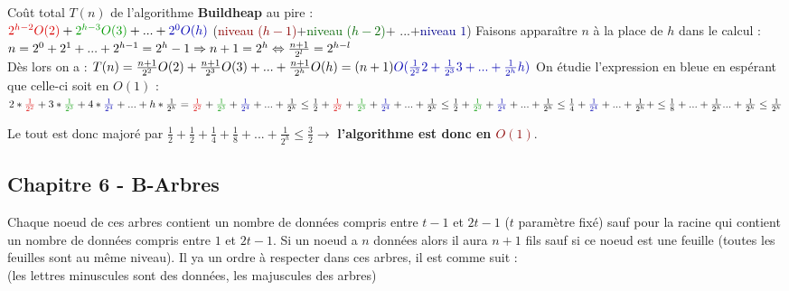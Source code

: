 \documentclass{article}
\newcommand{\gre}[1]{\textcolor{darkgreen}{#1}}
\newcommand{\blu}[1]{\textcolor{darkblue}{#1}}
\newcommand{\red}[1]{\textcolor{darkred}{#1}}
\begin{document}
\noindent Coût total $T(n)$ de l'algorithme \textbf{Buildheap} au pire : \\
$\red{2^{h-2}O(2)} + \gre{2^{h-3}O(3)} + ... + \blu{2^0O(h)}$ (\red{niveau ($h-1$)}$+$\gre{niveau ($h-2$)}$+$
...$+$\blu{niveau $1$})
Faisons apparaître $n$ à la place de $h$ dans le calcul : \\
$n = 2^0 + 2^1 + ... + 2^{h-1} = 2^h-1 \Rightarrow n+1 = 2^h \\
\Leftrightarrow \frac{n+1}{2^l} = 2^{h-l}$ \\
Dès lors on a : $T(n) \\ 
= \frac{n+1}{2^2}O(2) + \frac{n+1}{2^3}O(3) + ... + \frac{n+1}{2^h} O(h)\\
= (n+1) \blu{O(\frac{1}{2^2}2 + \frac{1}{2^3}3 + ... + \frac{1}{2^h}h)}$
On étudie l'expression en bleue en espérant que celle-ci soit en $O(1)$ :
$2*\red{\frac{1}{2^2}} + 3*\gre{\frac{1}{2^3}} + 4*\blu{\frac{1}{2^4}} + ... + h*\frac{1}{2^h}\\
= \red{\frac{1}{2^2}} + \gre{\frac{1}{2^3}} + \blu{\frac{1}{2^4}} + ... + \frac{1}{2^h} \leq \frac{1}{2}\\
+ \red{\frac{1}{2^2}} + \gre{\frac{1}{2^3}} + \blu{\frac{1}{2^4}} + ... + \frac{1}{2^h} \leq \frac{1}{2}\\
+ \gre{\frac{1}{2^3}} + \blu{\frac{1}{2^4}} + ... + \frac{1}{2^h} \leq \frac{1}{4}\\
+ \blu{\frac{1}{2^4}} + ... + \frac{1}{2^h} + \leq \frac{1}{8}\\
+ ... + \frac{1}{2^h} \\
...
+ \frac{1}{2^h} \leq \frac{1}{2^h}$

\noindent Le tout est donc majoré par $\frac{1}{2}+\frac{1}{2}+\frac{1}{4}+\frac{1}{8}+...+\frac{1}{2^h} \leq 
\frac{3}{2} \rightarrow$ \textbf{l'algorithme est donc en \red{$O(1)$}}.

\subsection{Chapitre 6 - B-Arbres}

Chaque noeud de ces arbres contient un nombre de données compris entre $t-1$ et $2t-1$ ($t$ paramètre fixé) sauf
pour la racine qui contient un nombre de données compris entre $1$ et $2t-1$. Si un noeud a $n$ données alors il 
aura $n+1$ fils sauf si ce noeud est une feuille (toutes les feuilles sont au même niveau). Il ya un ordre à 
respecter dans ces arbres, il est comme suit : \\ (les lettres minuscules sont des données, les majuscules des 
arbres)
\end{document}
